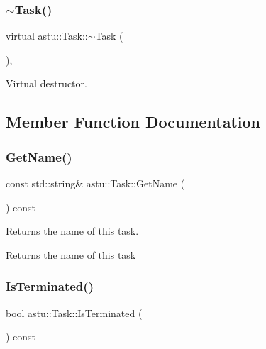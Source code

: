 \subsubsection{\texorpdfstring{$\sim$\+Task()}{~Task()}}
{\footnotesize\ttfamily virtual astu\+::\+Task\+::$\sim$\+Task (\begin{DoxyParamCaption}{ }\end{DoxyParamCaption})\hspace{0.3cm}{\ttfamily [inline]}, {\ttfamily [virtual]}}

Virtual destructor. 

\subsection{Member Function Documentation}
\mbox{\label{classastu_1_1Task_aa25f996b5c77b60166fe0c7e169b7c8c}} 
\subsubsection{\texorpdfstring{Get\+Name()}{GetName()}}
{\footnotesize\ttfamily const std\+::string\& astu\+::\+Task\+::\+Get\+Name (\begin{DoxyParamCaption}{ }\end{DoxyParamCaption}) const\hspace{0.3cm}{\ttfamily [inline]}}

Returns the name of this task.

\begin{DoxyReturn}{Returns}
the name of this task 
\end{DoxyReturn}
\mbox{\label{classastu_1_1Task_a4fc46f40fb4f4b0d7bddb0a417a2be5f}} 
\subsubsection{\texorpdfstring{Is\+Terminated()}{IsTerminated()}}
{\footnotesize\ttfamily bool astu\+::\+Task\+::\+Is\+Terminated (\begin{DoxyParamCaption}{ }\end{DoxyParamCaption}) const\hspace{0.3cm}{\ttfamily [inline]}}

